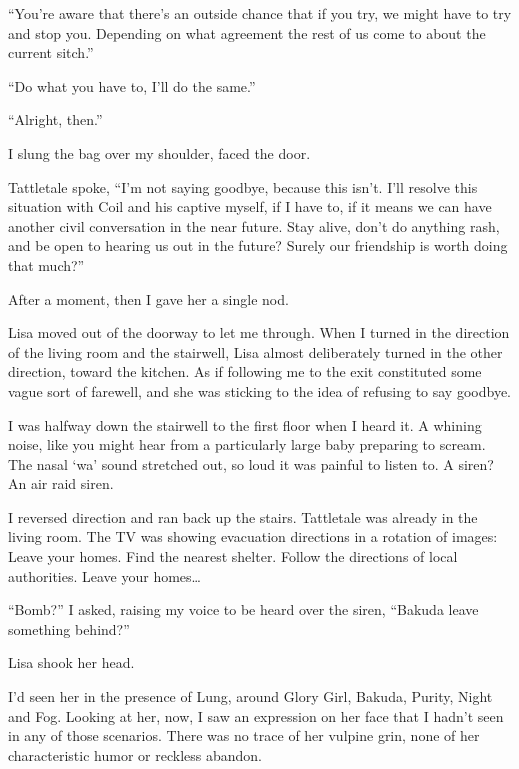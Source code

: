 ``You're aware that there's an outside chance that if you try, we might have to try and stop you.  Depending on what agreement the rest of us come to about the current sitch.''



``Do what you have to, I'll do the same.''



``Alright, then.''



I slung the bag over my shoulder, faced the door.



Tattletale spoke, ``I'm not saying goodbye, because this isn't.  I'll resolve this situation with Coil and his captive myself, if I have to, if it means we can have another civil conversation in the near future.  Stay alive, don't do anything rash, and be open to hearing us out in the future?  Surely our friendship is worth doing that much?''



After a moment, then I gave her a single nod.



Lisa moved out of the doorway to let me through.  When I turned in the direction of the living room and the stairwell, Lisa almost deliberately turned in the other direction, toward the kitchen.  As if following me to the exit constituted some vague sort of farewell, and she was sticking to the idea of refusing to say goodbye.



I was halfway down the stairwell to the first floor when I heard it.  A whining noise, like you might hear from a particularly large baby preparing to scream.  The nasal `wa' sound stretched out, so loud it was painful to listen to.  A siren?  An air raid siren.



I reversed direction and ran back up the stairs.  Tattletale was already in the living room.  The TV was showing evacuation directions in a rotation of images:  Leave your homes.  Find the nearest shelter.  Follow the directions of local authorities.  Leave your homes\ldots



``Bomb?'' I asked, raising my voice to be heard over the siren, ``Bakuda leave something behind?''



Lisa shook her head.



I'd seen her in the presence of Lung, around Glory Girl, Bakuda, Purity, Night and Fog.  Looking at her, now, I saw an expression on her face that I hadn't seen in any of those scenarios.  There was no trace of her vulpine grin, none of her characteristic humor or reckless abandon.



